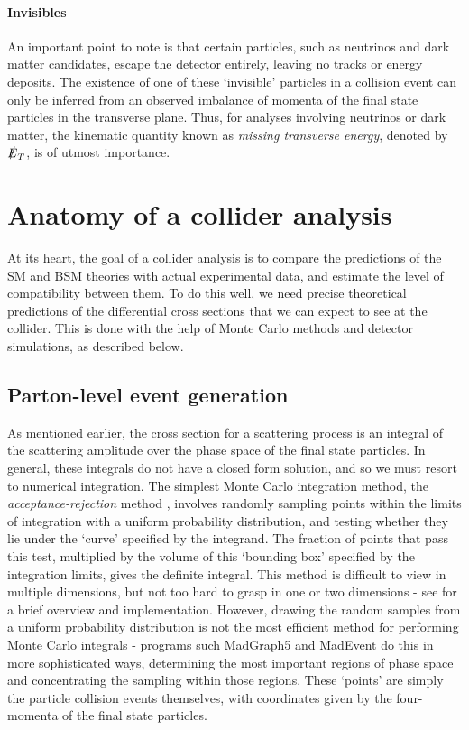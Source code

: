 \paragraph{Invisibles} An important point to note is that certain particles, such as neutrinos and dark matter candidates, escape the detector entirely, leaving no tracks or energy deposits. The existence of one of these `invisible' particles in a collision event can only be inferred from an observed imbalance of momenta of the final state particles in the transverse plane. Thus, for analyses involving neutrinos or dark matter, the kinematic quantity known as \emph{missing transverse energy}, denoted by $\slashed{E}_T$, is of utmost importance.

\section{Anatomy of a collider analysis}
At its heart, the goal of a collider analysis is to compare the predictions of the SM and BSM theories with actual experimental data, and estimate the level of compatibility between them. To do this well, we need precise theoretical predictions of the differential cross sections that we can expect to see at the collider. This is done with the help of Monte Carlo methods and detector simulations, as described below. 
\subsection{Parton-level event generation}
As mentioned earlier, the cross section for a scattering process is an integral of the scattering amplitude over the phase space of the final state particles. 
In general, these integrals do not have a closed form solution, and so we must resort to numerical integration. The simplest Monte Carlo integration method, the \emph{acceptance-rejection} method \citep{Press:2007:NRE:1403886}, involves randomly sampling points within the limits of integration with a uniform probability distribution, and testing whether they lie under the `curve' specified by the integrand. The fraction of points that pass this test, multiplied by the volume of this `bounding box' specified by the integration limits, gives the definite integral. This method is difficult to view in multiple dimensions, but not too hard to grasp in one or two dimensions - see \citep{Pyarelal:2011} for a brief overview and implementation. However, drawing the random samples from a uniform probability distribution is not the most efficient method for performing Monte Carlo integrals - programs such MadGraph5 and MadEvent \citep{Alwall:2014hca} do this in more sophisticated ways, determining the most important regions of phase space and concentrating the sampling within those regions. These `points' are simply the particle collision events themselves, with coordinates given by the four-momenta of the final state particles. 
